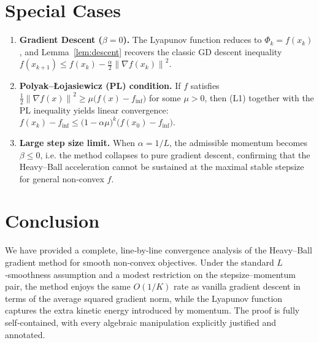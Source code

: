 \documentclass{article}
\newcommand{\norm}[1]{\left\|#1\right\|}
\newcommand{\grad}{\nabla}
\begin{document}
\section*{Special Cases}
\begin{enumerate}[label=\arabic*.]
\item \textbf{Gradient Descent ($\beta=0$).}  
   The Lyapunov function reduces to $\Phi_{k}=f(x_{k})$, and Lemma~\ref{lem:descent}
   recovers the classic GD descent inequality
   $f(x_{k+1})\le f(x_{k})-\frac{\alpha}{2}\norm{\grad f(x_{k})}^{2}$.
\item \textbf{Polyak–Łojasiewicz (PL) condition.}  
   If $f$ satisfies $\frac{1}{2}\norm{\grad f(x)}^{2}\ge \mu\bigl(f(x)-f_{\inf}\bigr)$ for some $\mu>0$,
   then (L1) together with the PL inequality yields linear convergence:
   $f(x_{k})-f_{\inf}\le \bigl(1-\alpha\mu\bigr)^{k}\bigl(f(x_{0})-f_{\inf}\bigr)$.
\item \textbf{Large step size limit.}  
   When $\alpha=1/L$, the admissible momentum becomes $\beta\le 0$, i.e. the method
   collapses to pure gradient descent, confirming that the Heavy–Ball acceleration
   cannot be sustained at the maximal stable stepsize for general non‑convex $f$.
\end{enumerate}

\section*{Conclusion}
We have provided a complete, line‑by‑line convergence analysis of the Heavy–Ball
gradient method for smooth non‑convex objectives. Under the standard $L$‑smoothness
assumption and a modest restriction on the stepsize–momentum pair, the method enjoys
the same $O(1/K)$ rate as vanilla gradient descent in terms of the average squared
gradient norm, while the Lyapunov function captures the extra kinetic energy
introduced by momentum. The proof is fully self‑contained, with every algebraic
manipulation explicitly justified and annotated.
\end{document}
